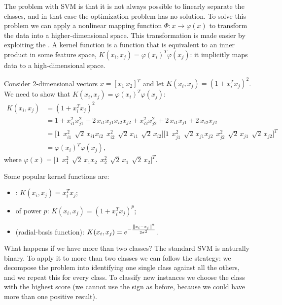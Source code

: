 The problem with SVM is that it is not always possible to linearly separate the classes, and in that case the optimization problem has no solution. To solve this problem we can apply a nonlinear mapping function $\Phi: x \to \varphi(x)$ to transform the data into a higher-dimensional space. This transformation is made easier by exploiting the . A kernel function is a function that is equivalent to an inner product in some feature space, $K(x_i, x_j) = \varphi(x_i)^T \varphi(x_j)$: it implicitly maps data to a high-dimensional space.

\begin{example}
Consider 2-dimensional vectors $x = [x_1 \ x_2]^T$ and let $K(x_i, x_j) = (1 + x_i^T x_j)^2$. We need to show that $K(x_i, x_j) = \varphi(x_i)^T \varphi(x_j)$:
\begin{align*}
  K(x_i, x_j) &= (1 + x_i^T x_j)^2 \\
  &= 1 + x_{i1}^2 x_{j1}^2 + 2\, x_{i1} x_{j1} x_{i2} x_{j2} + x_{i2}^2 x_{j2}^2 + 2\, x_{i1} x_{j1} + 2\, x_{i2} x_{j2} \\
  &= \bigl[1 \ \ x_{i1}^2 \ \ \sqrt{2}\, x_{i1} x_{i2} \ \ x_{i2}^2 \ \ \sqrt{2}\, x_{i1} \ \ \sqrt{2}\, x_{i2}\bigr]
     \bigl[1 \ \ x_{j1}^2 \ \ \sqrt{2}\, x_{j1} x_{j2} \ \ x_{j2}^2 \ \ \sqrt{2}\, x_{j1} \ \ \sqrt{2}\, x_{j2}\bigr]^T \\
  &= \varphi(x_i)^T \varphi(x_j),
\end{align*}
where $\varphi(x) = \bigl[1 \ \ x_1^2 \ \ \sqrt{2}\, x_1 x_2 \ \ x_2^2 \ \ \sqrt{2}\, x_1 \ \ \sqrt{2}\, x_2\bigr]^T$.
\end{example}

Some popular kernel functions are:
\begin{itemize}
  \item {}: $K(x_i, x_j) = x_i^T x_j$;
  \item {} of power $p$: $K(x_i, x_j) = (1 + x_i^T x_j)^p$;
  \item {} (radial-basis function): $K(x_i, x_j) = e^{-\frac{\left\lVert x_i - x_j \right\rVert^2}{2\sigma^2}}$.
\end{itemize}

What happens if we have more than two classes? The standard SVM is naturally binary. To apply it to more than two classes we can follow the  strategy: we decompose the problem into identifying one single class against all the others, and we repeat this for every class. To classify new instances we choose the class with the highest score (we cannot use the sign as before, because we could have more than one positive result).

